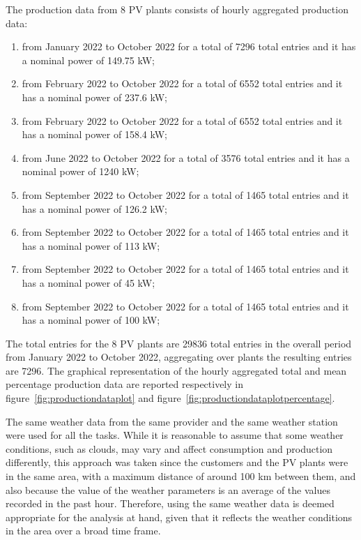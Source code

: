 The production data from 8 PV plants consists of hourly aggregated production data:
\begin{enumerate}
  \item from January 2022 to October 2022 for a total of 7296 total entries and it has a nominal power of 149.75 kW;
  \item from February 2022 to October 2022 for a total of 6552 total entries and it has a nominal power of 237.6 kW;
  \item from February 2022 to October 2022 for a total of 6552 total entries and it has a nominal power of 158.4 kW;
  \item from June 2022 to October 2022 for a total of 3576 total entries and it has a nominal power of 1240 kW;
  \item from September 2022 to October 2022 for a total of 1465 total entries and it has a nominal power of 126.2 kW;
  \item from September 2022 to October 2022 for a total of 1465 total entries and it has a nominal power of 113 kW;
  \item from September 2022 to October 2022 for a total of 1465 total entries and it has a nominal power of 45 kW;
  \item from September 2022 to October 2022 for a total of 1465 total entries and it has a nominal power of 100 kW;
\end{enumerate}
The total entries for the 8 PV plants are 29836 total entries in the overall period from January 2022 to October 2022, aggregating over plants the resulting entries are 7296.
The graphical representation of the hourly aggregated total and mean percentage production data are reported respectively in figure~\ref{fig:productiondataplot} and figure~\ref{fig:productiondataplotpercentage}.

The same weather data from the same provider and the same weather station were used for all the tasks.
While it is reasonable to assume that some weather conditions, such as clouds, may vary and affect consumption and production differently, this approach was taken since the customers and the PV plants were in the same area, with a maximum distance of around 100 km between them, and also because the value of the weather parameters is an average of the values recorded in the past hour.
Therefore, using the same weather data is deemed appropriate for the analysis at hand, given that it reflects the weather conditions in the area over a broad time frame.

